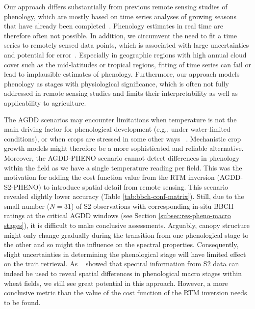 Our approach differs substantially from previous remote sensing studies of phenology, which are mostly based on time series analyses of growing seasons that have already been completed~\citep{zeng_review_2020}. Phenology estimates in real time are therefore often not possible. In addition, we circumvent the need to fit a time series to remotely sensed data points, which is associated with large uncertainties and potential for error~\citep{younes_all_2021}. Especially in geographic regions with high annual cloud cover such as the mid-latitudes or tropical regions, fitting of time series can fail or lead to implausible estimates of phenology. Furthermore, our approach models phenology as stages with physiological significance, which is often not fully addressed in remote sensing studies and limits their interpretability as well as applicability to agriculture.

The AGDD scenarios may encounter limitations when temperature is not the main driving factor for phenological development (e.g., under water-limited conditions), or when crops are stressed in some other ways ~\citep{bonecke_decoupling_2020}. Mechanistic crop growth models might therefore be a more sophisticated and reliable alternative. Moreover, the AGDD-PHENO scenario cannot detect differences in phenology within the field as we have a single temperature reading per field. This was the motivation for adding the cost function value from the \gls{RTM} inversion (AGDD-S2-PHENO) to introduce spatial detail from remote sensing. This scenario revealed slightly lower accuracy (Table \ref{tab:bbch-conf-matrix}). Still, due to the small number ($N=31$) of \gls{S2} observations with corresponding in-situ BBCH ratings at the critical AGDD windows (see Section \ref{subsec:res-pheno-macro stages}), it is difficult to make conclusive assessments. Arguably, canopy structure might only change gradually during the transition from one phenological stage to the other and so might the influence on the spectral properties. Consequently, slight uncertainties in determining the phenological stage will have limited effect on the trait retrieval. As ~\cite{liao_near_2023} showed that spectral information from \gls{S2} data can indeed be used to reveal spatial differences in phenological macro stages within wheat fields, we still see great potential in this approach. However, a more conclusive metric than the value of the cost function of the \gls{RTM} inversion needs to be found.

